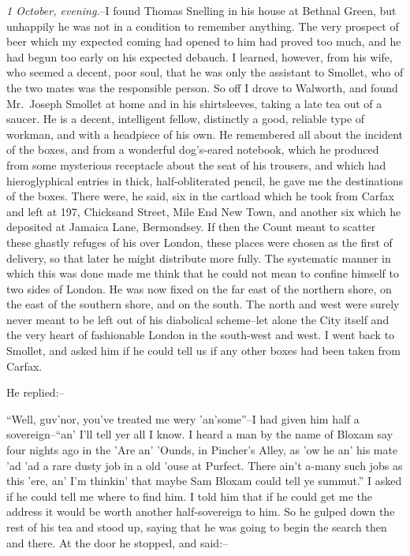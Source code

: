 \documentclass[12pt,openright]{book}
\begin{document}
\textit{1 October, evening.}–I found Thomas Snelling in his house at Bethnal Green, but unhappily he was not in a condition to remember anything. The very prospect of beer which my expected coming had opened to him had proved too much, and he had begun too early on his expected debauch. I learned, however, from his wife, who seemed a decent, poor soul, that he was only the assistant to Smollet, who of the two mates was the responsible person. So off I drove to Walworth, and found Mr. Joseph Smollet at home and in his shirtsleeves, taking a late tea out of a saucer. He is a decent, intelligent fellow, distinctly a good, reliable type of workman, and with a headpiece of his own. He remembered all about the incident of the boxes, and from a wonderful dog’s-eared notebook, which he produced from some mysterious receptacle about the seat of his trousers, and which had hieroglyphical entries in thick, half-obliterated pencil, he gave me the destinations of the boxes. There were, he said, six in the cartload which he took from Carfax and left at 197, Chicksand Street, Mile End New Town, and another six which he deposited at Jamaica Lane, Bermondsey. If then the Count meant to scatter these ghastly refuges of his over London, these places were chosen as the first of delivery, so that later he might distribute more fully. The systematic manner in which this was done made me think that he could not mean to confine himself to two sides of London. He was now fixed on the far east of the northern shore, on the east of the southern shore, and on the south. The north and west were surely never meant to be left out of his diabolical scheme–let alone the City itself and the very heart of fashionable London in the south-west and west. I went back to Smollet, and asked him if he could tell us if any other boxes had been taken from Carfax.

He replied:–

“Well, guv’nor, you’ve treated me wery ’an’some”–I had given him half a sovereign–“an’ I’ll tell yer all I know. I heard a man by the name of Bloxam say four nights ago in the ’Are an’ ’Ounds, in Pincher’s Alley, as ’ow he an’ his mate ’ad ’ad a rare dusty job in a old ’ouse at Purfect. There ain’t a-many such jobs as this ’ere, an’ I’m thinkin’ that maybe Sam Bloxam could tell ye summut.” I asked if he could tell me where to find him. I told him that if he could get me the address it would be worth another half-sovereign to him. So he gulped down the rest of his tea and stood up, saying that he was going to begin the search then and there. At the door he stopped, and said:–
\end{document}
